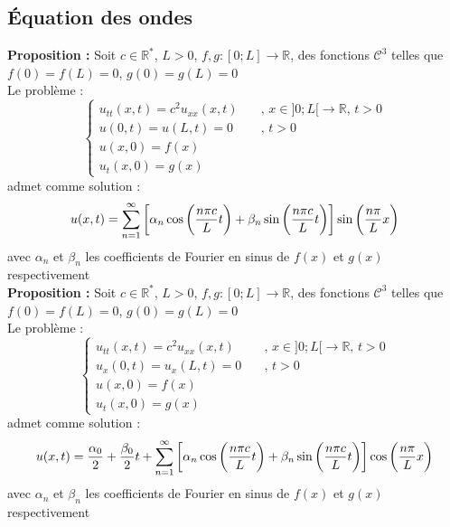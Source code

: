 \subsection{Équation des ondes}
\textbf{Proposition :} Soit $c \in \mathbb{R}^*$, $L > 0$, $f,g : [0;L] \to \mathbb{R}$, des fonctions $\mathcal{C}^3$ telles que $f(0) = f(L) = 0$, $g(0) = g(L) = 0$\\
Le problème :
$$
\begin{cases}
    u_{tt}(x,t) = c^2u_{xx}(x,t) \quad &\text{, } x \in ]0;L[ \to \mathbb{R} \text{, } t > 0 \\
    u(0,t) = u(L,t) = 0 \quad &\text{, } t > 0 \\
    u(x,0) = f(x) \\
    u_t(x,0) = g(x)
\end{cases}
$$
admet comme solution :
$$u(x,t) = \sum_{n=1}^{\infty} \bigg{[} \alpha_n \cos \bigg{(} \frac{n\pi c}{L}t \bigg{)} + \beta_n \sin \bigg{(} \frac{n\pi c}{L}t \bigg{)} \bigg{]} \sin \bigg{(} \frac{n\pi}{L}x \bigg{)}$$
avec $\alpha_n$ et $\beta_n$ les coefficients de Fourier en sinus de $f(x)$ et $g(x)$ respectivement \\
\textbf{Proposition :} Soit $c \in \mathbb{R}^*$, $L > 0$, $f,g : [0;L] \to \mathbb{R}$, des fonctions $\mathcal{C}^3$ telles que $f(0) = f(L) = 0$, $g(0) = g(L) = 0$\\
Le problème :
$$
\begin{cases}
    u_{tt}(x,t) = c^2u_{xx}(x,t) \quad &\text{, } x \in ]0;L[ \to \mathbb{R} \text{, } t > 0 \\
    u_x(0,t) = u_x(L,t) = 0 \quad &\text{, } t > 0 \\
    u(x,0) = f(x) \\
    u_t(x,0) = g(x)
\end{cases}
$$
admet comme solution :
$$u(x,t) = \frac{\alpha_0}{2} + \frac{\beta_0}{2}t + \sum_{n=1}^{\infty} \bigg{[} \alpha_n \cos \bigg{(} \frac{n\pi c}{L}t \bigg{)} + \beta_n \sin \bigg{(} \frac{n\pi c}{L}t \bigg{)} \bigg{]} \cos \bigg{(} \frac{n\pi}{L}x \bigg{)}$$
avec $\alpha_n$ et $\beta_n$ les coefficients de Fourier en sinus de $f(x)$ et $g(x)$ respectivement